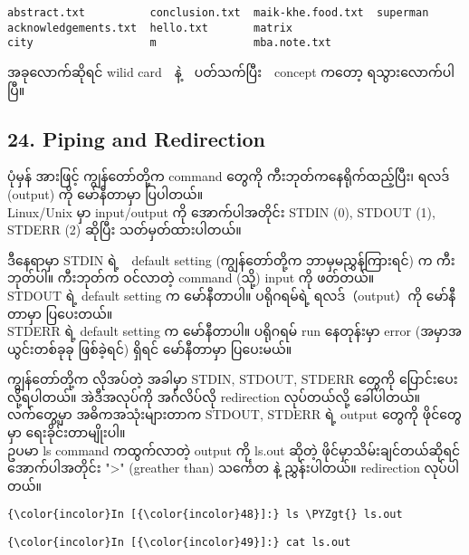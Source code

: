 \documentclass[11pt]{article}
\def\PYZgt{\char`\>}
\begin{document}
    \begin{Verbatim}[commandchars=\\\{\}]
abstract.txt          conclusion.txt  maik-khe.food.txt  superman
acknowledgements.txt  hello.txt       matrix
city                  m               mba.note.txt

    \end{Verbatim}

    အခုလောက်ဆိုရင် wilid card　နဲ့　ပတ်သက်ပြီး　concept ကတော့
ရသွားလောက်ပါပြီ။

    \subsection{24. Piping and Redirection}\label{piping-and-redirection}

ပုံမှန် အားဖြင့် ကျွန်တော်တို့က command တွေကို ကီးဘုတ်ကနေရိုက်ထည့်ပြီး၊
ရလဒ် (output) ကို မော်နီတာမှာ ပြပါတယ်။\\
Linux/Unix မှာ input/output ကို အောက်ပါအတိုင်း STDIN (0), STDOUT (1),
STDERR (2) ဆိုပြီး သတ်မှတ်ထားပါတယ်။

ဒီနေရာမှာ STDIN ရဲ့　default setting (ကျွန်တော်တို့က ဘာမှမညွှန်ကြားရင်)
က ကီးဘုတ်ပါ။ ကီးဘုတ်က ဝင်လာတဲ့ command (သို့) input ကို ဖတ်တယ်။\\
STDOUT ရဲ့ default setting က မော်နီတာပါ။ ပရိုဂရမ်ရဲ့ ရလဒ်（output）ကို
မော်နီတာမှာ ပြပေးတယ်။\\
STDERR ရဲ့ default setting က မော်နီတာပါ။ ပရိုဂရမ် run နေတုန်းမှာ error
(အမှာအယွင်းတစ်ခုခု ဖြစ်ခဲ့ရင်) ရှိရင် မော်နီတာမှာ ပြပေးမယ်။

ကျွန်တော်တို့က လိုအပ်တဲ့ အခါမှာ STDIN, STDOUT, STDERR တွေကို
ပြောင်းပေးလို့ရပါတယ်။ အဲဒီအလုပ်ကို အင်္ဂလိပ်လို redirection လုပ်တယ်လို့
ခေါ်ပါတယ်။\\
လက်တွေ့မှာ အဓိကအသုံးများတာက STDOUT, STDERR ရဲ့ output တွေကို ဖိုင်တွေမှာ
ရေးခိုင်းတာမျိုးပါ။\\
ဥပမာ ls command ကထွက်လာတဲ့ output ကို ls.out ဆိုတဲ့
ဖိုင်မှာသိမ်းချင်တယ်ဆိုရင် အောက်ပါအတိုင်း "\textgreater{}" (greather
than) သင်္ကေတ နဲ့ ညွှန်းပါတယ်။ redirection လုပ်ပါတယ်။

    \begin{Verbatim}[commandchars=\\\{\}]
{\color{incolor}In [{\color{incolor}48}]:} ls \PYZgt{} ls.out
\end{Verbatim}

    \begin{Verbatim}[commandchars=\\\{\}]
{\color{incolor}In [{\color{incolor}49}]:} cat ls.out
\end{Verbatim}
\end{document}

